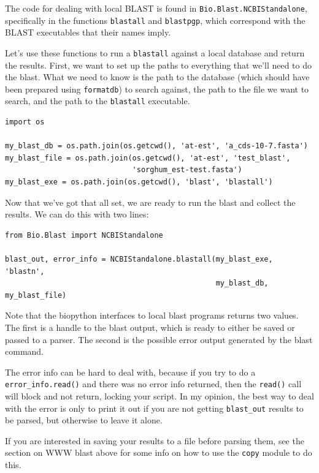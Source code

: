 \documentclass{report}
\begin{document}
The code for dealing with local BLAST is found in \verb|Bio.Blast.NCBIStandalone|, specifically in the functions \verb|blastall| and \verb|blastpgp|, which correspond with the BLAST executables that their names imply.


Let's use these functions to run a \verb|blastall| against a local database and return the results. First, we want to set up the paths to everything that we'll need to do the blast. What we need to know is the path to the database (which should have been prepared using \verb|formatdb|) to search against, the path to the file we want to search, and the path to the \verb|blastall| executable.

\begin{verbatim}
import os

my_blast_db = os.path.join(os.getcwd(), 'at-est', 'a_cds-10-7.fasta')
my_blast_file = os.path.join(os.getcwd(), 'at-est', 'test_blast',
                             'sorghum_est-test.fasta')
my_blast_exe = os.path.join(os.getcwd(), 'blast', 'blastall')
\end{verbatim}

Now that we've got that all set, we are ready to run the blast and collect the results. We can do this with two lines:

\begin{verbatim}
from Bio.Blast import NCBIStandalone

blast_out, error_info = NCBIStandalone.blastall(my_blast_exe, 'blastn',
                                                my_blast_db, my_blast_file)
\end{verbatim}

Note that the biopython interfaces to local blast programs returns two values. The first is a handle to the blast output, which is ready to either be saved or passed to a parser. The second is the possible error output generated by the blast command.


The error info can be hard to deal with, because if you try to do a \verb|error_info.read()| and there was no error info returned, then the \verb|read()| call will block and not return, locking your script. In my opinion, the best way to deal with the error is only to print it out if you are not getting \verb|blast_out| results to be parsed, but otherwise to leave it alone.


If you are interested in saving your results to a file before parsing them, see the section on WWW blast above for some info on how to use the \verb|copy| module to do this.
\end{document}
